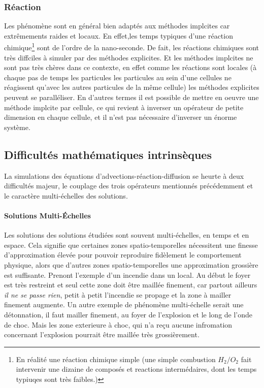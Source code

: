 \subsubsection{Réaction}
    Les phénomène sont en général bien adaptés aux méthodes implcites car extrêmements raides et locaux.
    En effet,les temps typiques d'une réaction chimique\footnote{
    En réalité une réaction chimique simple (une simple combustion $H_2/O_2$ fait intervenir une dizaine de composés et reactions intermédaires, dont les temps typiuqes sont très faibles.)} sont de l'ordre de la nano-seconde.
    De fait, les réactions chimiques sont très diffciles à simuler par des méthodes explicites.
    Et les méthodes implcites ne sont pas très chères dans ce contexte, en effet comme les réactions sont locales 
    (à chaque pas de temps les particules les particules au sein d'une cellules ne réagissent qu'avec les autres particules de la même cellule)
    les méthodes explicites peuvent se paralléliser. En d'autres termes il est possible de mettre en oeuvre une méthode implcite par cellule,
    ce qui revient à inverser un opérateur de petite dimension en chaque cellule, et il n'est pas nécessaire d'inverser un énorme système.

\subsection{Difficultés mathématiques intrinsèques}
    La simulations des équations d'advections-réaction-diffusion se heurte à deux difficultés majeur, le couplage des trois opérateurs mentionnés précédemment
    et le caractère multi-échelles des solutions.

    \paragraph{Solutions Multi-Échelles}
        Les solutions des solutions étudiées sont souvent multi-échelles, en temps et en espace. Cela signifie que certaines zones spatio-temporelles nécessitent
        une finesse d'approximation élevée pour pouvoir reproduire fidèlement le comportement physique, alors que d'autres zones spatio-temporelles une approximation
        grossière est suffisante. Prenont l'exemple d'un incendie dans un local. Au début le foyer est très restreint et seul cette zone doit être maillée finement, 
        car partout ailleurs \textit{il ne se passe rien}, petit à petit l'incendie se propage et la zone à mailler finement augmente. Un autre exemple de phénomène 
        multi-échelle serait une détonnation, il faut mailler finement, au foyer de l'explosion et le long de l'onde de choc. Mais les zone exterieure à choc, 
        qui n'a reçu aucune infromation concernant l'explosion pourrait être maillée très grossièrement.
